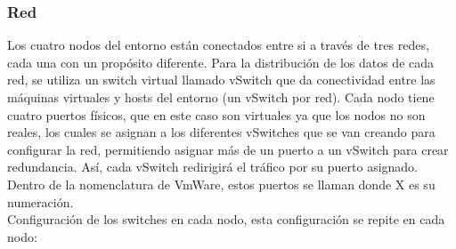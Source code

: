 \subsubsection{Red}
\label{sec:redPrueba}
Los cuatro nodos del entorno están conectados entre si a través de tres redes, cada una con un propósito diferente. Para la distribución de los datos de cada red, se utiliza un switch virtual llamado vSwitch que da conectividad entre las máquinas virtuales y hosts del entorno (un vSwitch por red). Cada nodo tiene cuatro puertos físicos, que en este caso son virtuales ya que los nodos no son reales, los cuales se asignan a los diferentes vSwitches que se van creando para configurar la red, permitiendo asignar más de un puerto a un vSwitch para crear redundancia. Así, cada vSwitch redirigirá el tráfico por su puerto asignado. Dentro de la nomenclatura de VmWare, estos puertos se llaman  donde X es su numeración.\\
Configuración de los switches en cada nodo, esta configuración se repite en cada nodo:
